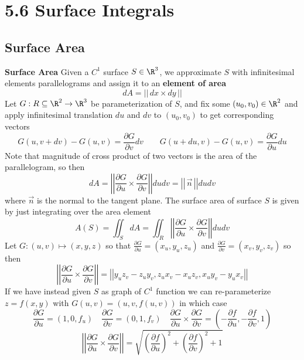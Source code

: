 \documentclass[11pt]{article}
\begin{document}
\section*{5.6 Surface Integrals}

\subsection*{Surface Area}

\begin{defn*}
  \textbf{Surface Area} Given a $C^1$ surface $S\in\R^3$, we approximate $S$ with infinitesimal elements parallelograms and assign it to an \textbf{element of area}
  \[
    dA = ||\,dx \times dy\,||
  \]
  Let $G:R\subseteq\R^2 \to \R^3$ be parameterization of $S$, and fix some $(u_0, v_0)\in\R^2$ and apply infinitesimal translation $du$ and $dv$ to $(u_0, v_0)$ to get corresponding vectors
  \[
    G(u, v + dv) - G(u, v) = \frac{\partial G}{\partial v}dv \quad \quad G(u + du, v) - G(u,v) = \frac{\partial G}{\partial u}du
  \]
  Note that magnitude of cross product of two vectors is the area of the parallelogram, so then
  \[
    dA = \left|\left| \frac{\partial G}{\partial u} \times \frac{\partial G}{\partial v} \right|\right| dudv = \left|\left| \, \vec{n} \, \right|\right|dudv
  \]
  where $\vec{n}$ is the normal to the tangent plane. The surface area of surface $S$ is given by just integrating over the area element
  \[
    A(S) = \iint_S dA = \iint_R \left|\left| \frac{\partial G}{\partial u} \times \frac{\partial G}{\partial v} \right|\right| dudv
  \]
  Let $G: (u,v)\mapsto (x,y,z)$ so that $\frac{\partial G}{\partial u} = (x_u, y_u, z_u)$ and $\frac{\partial G}{\partial v} = (x_v, y_v, z_v)$ so then
  \[
    \left|\left| \frac{\partial G}{\partial u} \times \frac{\partial G}{\partial v} \right|\right| = \left|\left| y_uz_v - z_uy_v, z_ux_v - x_uz_v, x_uy_v - y_ux_v  \right|\right|
  \]
  If we have instead given $S$ as graph of $C^1$ function we can re-parameterize $z = f(x,y)$ with $G(u,v) = (u,v,f(u,v))$ in which case
  \[
    \frac{\partial G}{\partial u} = (1, 0, f_u) \quad \frac{\partial G}{\partial v} = (0, 1, f_v) \quad
    \frac{\partial G}{\partial u} \times \frac{\partial G}{\partial v} = (-\frac{\partial f}{\partial u}, -\frac{\partial f}{\partial v}, 1)
  \]
  \[
    \left|\left| \frac{\partial G}{\partial u} \times \frac{\partial G}{\partial v} \right|\right| = \sqrt{ \left( \frac{\partial f}{\partial u} \right)^2 + \left( \frac{\partial f}{\partial v} \right)^2 + 1}
  \]
\end{defn*}
\end{document}
